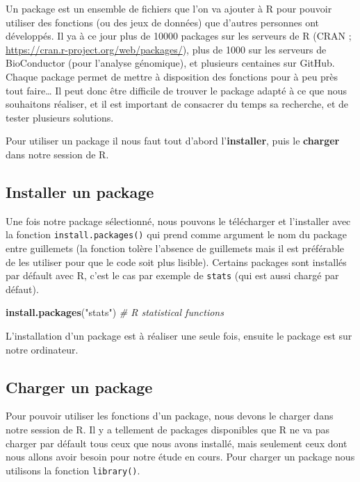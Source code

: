 \documentclass[]{book}
\newenvironment{Shaded}{\begin{snugshade}}{\end{snugshade}}
\newcommand{\CommentTok}[1]{\textcolor[rgb]{0.56,0.35,0.01}{\textit{#1}}}
\newcommand{\KeywordTok}[1]{\textcolor[rgb]{0.13,0.29,0.53}{\textbf{#1}}}
\newcommand{\NormalTok}[1]{#1}
\newcommand{\StringTok}[1]{\textcolor[rgb]{0.31,0.60,0.02}{#1}}
\begin{document}
Un package est un ensemble de fichiers que l'on va ajouter à R pour pouvoir utiliser des fonctions (ou des jeux de données) que d'autres personnes ont développés. Il ya à ce jour plus de 10000 packages sur les serveurs de R (CRAN ; \url{https://cran.r-project.org/web/packages/}), plus de 1000 sur les serveurs de BioConductor (pour l'analyse génomique), et plusieurs centaines sur GitHub. Chaque package permet de mettre à disposition des fonctions pour à peu près tout faire\ldots{} Il peut donc être difficile de trouver le package adapté à ce que nous souhaitons réaliser, et il est important de consacrer du temps sa recherche, et de tester plusieurs solutions.

Pour utiliser un package il nous faut tout d'abord l'\textbf{installer}, puis le \textbf{charger} dans notre session de R.

\hypertarget{installer-un-package}{%
\subsection{Installer un package}\label{installer-un-package}}

Une fois notre package sélectionné, nous pouvons le télécharger et l'installer avec la fonction \texttt{install.packages()} qui prend comme argument le nom du package entre guillemets (la fonction tolère l'absence de guillemets mais il est préférable de les utiliser pour que le code soit plus lisible). Certains packages sont installés par défault avec R, c'est le cas par exemple de \texttt{stats} (qui est aussi chargé par défaut).

\begin{Shaded}
\begin{Highlighting}[]
\KeywordTok{install.packages}\NormalTok{(}\StringTok{"stats"}\NormalTok{) }\CommentTok{# R statistical functions}
\end{Highlighting}
\end{Shaded}

L'installation d'un package est à réaliser une seule fois, ensuite le package est sur notre ordinateur.

\hypertarget{charger-un-package}{%
\subsection{Charger un package}\label{charger-un-package}}

Pour pouvoir utiliser les fonctions d'un package, nous devons le charger dans notre session de R. Il y a tellement de packages disponibles que R ne va pas charger par défault tous ceux que nous avons installé, mais seulement ceux dont nous allons avoir besoin pour notre étude en cours. Pour charger un package nous utilisons la fonction \texttt{library()}.
\end{document}

